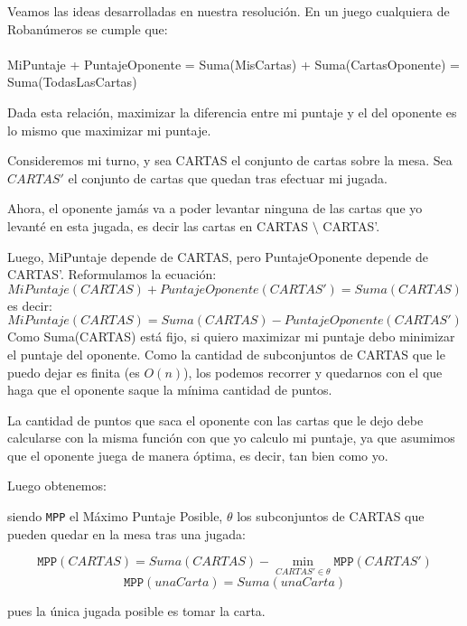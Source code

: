 \documentclass[11pt, a4paper, twoside]{article}
\begin{document}
{}

Veamos las ideas desarrolladas en nuestra resolución. En un juego cualquiera de
Robanúmeros se cumple que:
\\\\MiPuntaje + PuntajeOponente = Suma(MisCartas) + Suma(CartasOponente) = Suma(TodasLasCartas) 


Dada esta relación, maximizar la diferencia entre mi puntaje y el del oponente es lo mismo
que maximizar mi puntaje. 


Consideremos mi turno, y sea CARTAS el conjunto de cartas sobre la mesa. Sea $CARTAS'$ el conjunto de cartas que quedan tras efectuar mi jugada.

Ahora, el oponente jamás va a poder levantar ninguna de las cartas que yo levanté en esta jugada, es decir las cartas en CARTAS $\setminus$ CARTAS'. 

Luego, MiPuntaje depende de CARTAS, pero PuntajeOponente depende de CARTAS'. Reformulamos la ecuación:
\[
MiPuntaje(CARTAS) + PuntajeOponente(CARTAS') = Suma(CARTAS)
\]
es decir:
\[
MiPuntaje(CARTAS) = Suma(CARTAS) - PuntajeOponente(CARTAS') 
\]
Como Suma(CARTAS) está fijo, si quiero maximizar mi puntaje debo minimizar el puntaje del oponente. Como la cantidad de subconjuntos de CARTAS que le puedo
dejar es finita (es $O(n)$), los podemos recorrer y quedarnos con el que haga
que el oponente saque la mínima cantidad de puntos.

La cantidad de puntos que saca el oponente con las cartas que le dejo debe calcularse con la misma función con que yo calculo mi puntaje, ya que asumimos que el oponente juega de manera óptima, es decir, tan bien como yo. 

Luego obtenemos:
\begin{proposicion}\label{prop:ej1-mpp}

siendo \texttt{MPP} el Máximo Puntaje Posible, $\theta$ los subconjuntos de
CARTAS que pueden quedar en la mesa tras una jugada:

\[
\texttt{MPP}(CARTAS) = Suma(CARTAS) - \min\limits_{CARTAS' \in \theta} \texttt{MPP}(CARTAS')
\]
\[
\texttt{MPP}(unaCarta) = Suma(unaCarta)
\]

pues la única jugada posible es tomar la carta.
\end{proposicion}
\end{document}
